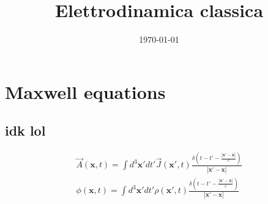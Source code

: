 \documentclass[a4paper, twocolumn]{article}
\title{Elettrodinamica classica}
\date{\today}
\begin{document}
\maketitle







\section{Maxwell equations}
\subsection{idk lol}
\begin{align}
	\vec{A}(\mathbf{x},t)=\int d^3\mathbf{x'}dt'\vec{J}(\mathbf{x'},t) \frac{\delta (t-t'- \frac{\left|\mathbf{x'}-\mathbf{x}\right|}{c})}{\left|\mathbf{x'}-\mathbf{x}\right|} \tag{$\alpha$ costanti se S.I.} \\
		\phi (\mathbf{x},t)=\int d^3\mathbf{x'}dt' \rho(\mathbf{x'},t) \frac{\delta (t-t'- \frac{\left|\mathbf{x'}-\mathbf{x}\right|}{c})}{\left|\mathbf{x'}-\mathbf{x}\right|} \tag{$\alpha$ altre costanti se S.I.}
\end{align}
\end{document}
